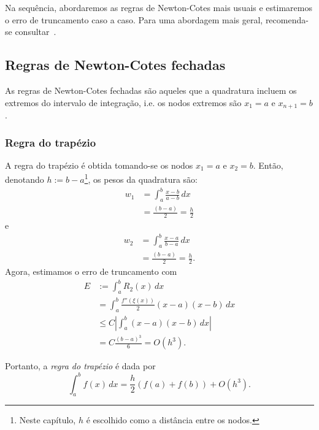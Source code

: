 Na sequência, abordaremos as regras de Newton-Cotes mais usuais e estimaremos o erro de truncamento caso a caso. Para uma abordagem mais geral, recomenda-se consultar~\cite[Cap. 7,Sec. 1.1]{Isaacson1994a}.

\subsection{Regras de Newton-Cotes fechadas}

As regras de Newton-Cotes fechadas são aqueles que a quadratura incluem os extremos do intervalo de integração, i.e. os nodos extremos são $x_1=a$ e $x_{n+1}=b$.

\subsubsection{Regra do trapézio}

A regra do trapézio é obtida tomando-se os nodos $x_1=a$ e $x_2=b$. Então, denotando $h:=b-a$\footnote{Neste capítulo, $h$ é escolhido como a distância entre os nodos.}, os pesos da quadratura são:
\begin{align}
  w_1 &= \int_a^b \frac{x-b}{a-b}\,dx \\
  &= \frac{(b-a)}{2} = \frac{h}{2}
\end{align}
e
\begin{align}
  w_2 &= \int_a^b \frac{x-a}{b-a}\,dx \\
  &= \frac{(b-a)}{2} = \frac{h}{2}.
\end{align}
Agora, estimamos o erro de truncamento com
\begin{align}
  E &:= \int_a^b R_2(x)\,dx\\
  &= \int_a^b \frac{f''(\xi(x))}{2}(x-a)(x-b)\,dx\\
  &\leq C\left|\int_a^b (x-a)(x-b)\,dx\right|\\
  &= C\frac{(b-a)^3}{6} = O(h^3).
\end{align}

Portanto, a \emph{regra do trapézio} é dada por
\begin{equation}
  \int_a^b f(x)\,dx = \frac{h}{2}(f(a) + f(b)) + O(h^3).
\end{equation}

